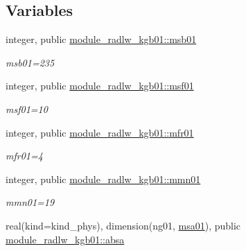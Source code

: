 \subsection*{Variables}
\begin{DoxyCompactItemize}
\item 
\mbox{\label{group__module__radlw__kgbnn_gae34d953adc793ad27a294864e3e0e354}} 
integer, public \hyperlink{group__module__radlw__kgbnn_gae34d953adc793ad27a294864e3e0e354}{module\+\_\+radlw\+\_\+kgb01\+::msb01}
\begin{DoxyCompactList}\small\item\em msb01=235 \end{DoxyCompactList}\item 
\mbox{\label{group__module__radlw__kgbnn_ga321c2e84e14d28142d08bb5fbe485a67}} 
integer, public \hyperlink{group__module__radlw__kgbnn_ga321c2e84e14d28142d08bb5fbe485a67}{module\+\_\+radlw\+\_\+kgb01\+::msf01}
\begin{DoxyCompactList}\small\item\em msf01=10 \end{DoxyCompactList}\item 
\mbox{\label{group__module__radlw__kgbnn_ga4bd2e710d96291436f9ee36e99816a19}} 
integer, public \hyperlink{group__module__radlw__kgbnn_ga4bd2e710d96291436f9ee36e99816a19}{module\+\_\+radlw\+\_\+kgb01\+::mfr01}
\begin{DoxyCompactList}\small\item\em mfr01=4 \end{DoxyCompactList}\item 
\mbox{\label{group__module__radlw__kgbnn_ga218c6844f9043f362571f091a4f80522}} 
integer, public \hyperlink{group__module__radlw__kgbnn_ga218c6844f9043f362571f091a4f80522}{module\+\_\+radlw\+\_\+kgb01\+::mmn01}
\begin{DoxyCompactList}\small\item\em mmn01=19 \end{DoxyCompactList}\item 
\mbox{\label{group__module__radlw__kgbnn_gacdbe767d50d503c4a89d4042dd0dee8e}} 
real(kind=kind\+\_\+phys), dimension(ng01, \hyperlink{namespacemodule__radlw__kgb01_a60db2a67b7f03a52fa88acd2c7874dfc}{msa01}), public \hyperlink{group__module__radlw__kgbnn_gacdbe767d50d503c4a89d4042dd0dee8e}{module\+\_\+radlw\+\_\+kgb01\+::absa}

\end{DoxyCompactItemize}
